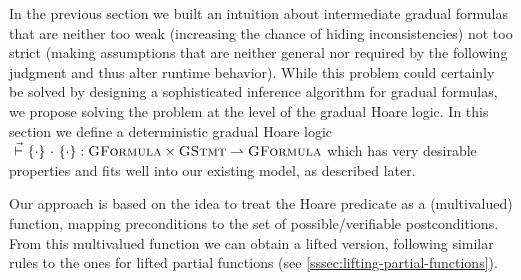 %
%
%
%

In the previous section we built an intuition about intermediate gradual formulas that are neither too weak (increasing the chance of hiding inconsistencies) not too strict (making assumptions that are neither general nor required by the following judgment and thus alter runtime behavior).
While this problem could certainly be solved by designing a sophisticated inference algorithm for gradual formulas, we propose solving the problem at the level of the gradual Hoare logic.
In this section we define a deterministic gradual Hoare logic ${} \,\,\vec{\vdash}\,\, \{{\cdot}\} ~{\cdot}~ \{{\cdot}\} : \textup{\textsc{GFormula}} \times \textup{\textsc{GStmt}} \rightharpoonup \textup{\textsc{GFormula}}$ which has very desirable properties and fits well into our existing model, as described later.

Our approach is based on the idea to treat the Hoare predicate as a (multivalued) function, mapping preconditions to the set of possible/verifiable postconditions.
From this multivalued function we can obtain a lifted version, following similar rules to the ones for lifted partial functions (see \ref{sssec:lifting-partial-functions}).

